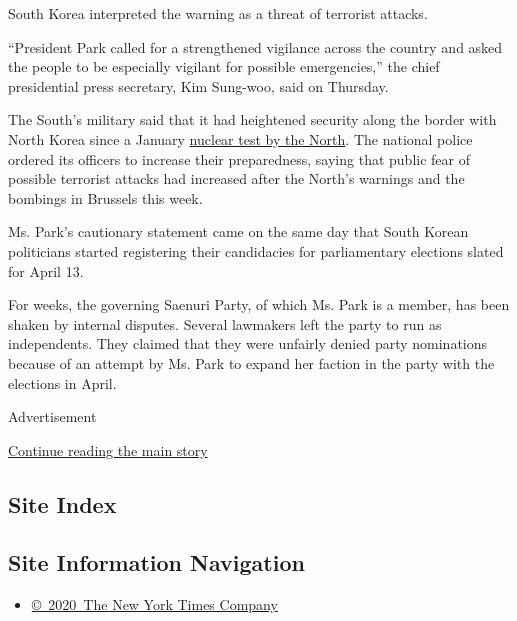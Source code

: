 South Korea interpreted the warning as a threat of terrorist attacks.

``President Park called for a strengthened vigilance across the country
and asked the people to be especially vigilant for possible
emergencies,'' the chief presidential press secretary, Kim Sung-woo,
said on Thursday.

The South's military said that it had heightened security along the
border with North Korea since a January
\href{http://www.nytimes3xbfgragh.onion/2016/01/06/world/asia/north-korea-hydrogen-bomb-test.html}{nuclear
test by the North}. The national police ordered its officers to increase
their preparedness, saying that public fear of possible terrorist
attacks had increased after the North's warnings and the bombings in
Brussels this week.

Ms. Park's cautionary statement came on the same day that South Korean
politicians started registering their candidacies for parliamentary
elections slated for April 13.

For weeks, the governing Saenuri Party, of which Ms. Park is a member,
has been shaken by internal disputes. Several lawmakers left the party
to run as independents. They claimed that they were unfairly denied
party nominations because of an attempt by Ms. Park to expand her
faction in the party with the elections in April.

Advertisement

\protect\hyperlink{after-bottom}{Continue reading the main story}

\hypertarget{site-index}{%
\subsection{Site Index}\label{site-index}}

\hypertarget{site-information-navigation}{%
\subsection{Site Information
Navigation}\label{site-information-navigation}}

\begin{itemize}
\tightlist
\item
  \href{https://help.nytimes3xbfgragh.onion/hc/en-us/articles/115014792127-Copyright-notice}{©~2020~The
  New York Times Company}
\end{itemize}

